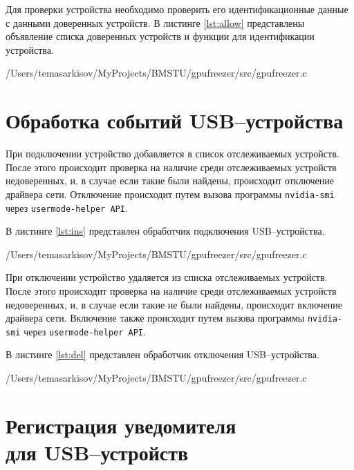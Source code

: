 Для проверки устройства необходимо проверить его идентификационные данные с данными доверенных устройств. В листинге \ref{lst:allow} представлены объявление списка доверенных устройств и функции для идентификации устройства.

\newpage
\begin{lstinputlisting}[
	caption={Функции для идентификации устройств},
	label={lst:allow},
	style={c},
	linerange={18-21, 25-81},
	]{/Users/temasarkisov/MyProjects/BMSTU/gpufreezer/src/gpufreezer.c}
\end{lstinputlisting}

\section{Обработка событий USB--устройства}

При подключении устройство добавляется в список отслеживаемых устройств. После этого происходит проверка на наличие среди отслеживаемых устройств недоверенных, и, в случае если такие были найдены, происходит отключение драйвера сети. Отключение происходит путем вызова программы \texttt{nvidia-smi} через \texttt{usermode-helper API}.

В листинге \ref{lst:ins} представлен обработчик подключения USB--устройства.

\begin{lstinputlisting}[
	caption={Обработчик подключения USB--устройства},
	label={lst:ins},
	style={c},
	linerange={106-145},
	]{/Users/temasarkisov/MyProjects/BMSTU/gpufreezer/src/gpufreezer.c}
\end{lstinputlisting}

При отключении устройство удаляется из списка отслеживаемых устройств. После этого происходит проверка на наличие среди отслеживаемых устройств недоверенных, и, в случае если такие не были найдены, происходит включение драйвера сети. Включение также происходит путем вызова программы \texttt{nvidia-smi} через \texttt{usermode-helper API}.

В листинге \ref{lst:del} представлен обработчик отключения USB--устройства.

\begin{lstinputlisting}[
	caption={Обработчик отключения USB--устройства},
	label={lst:del},
	style={c},
	linerange={147-178},
	]{/Users/temasarkisov/MyProjects/BMSTU/gpufreezer/src/gpufreezer.c}
\end{lstinputlisting}

\section{Регистрация уведомителя\\ для USB--устройств}

